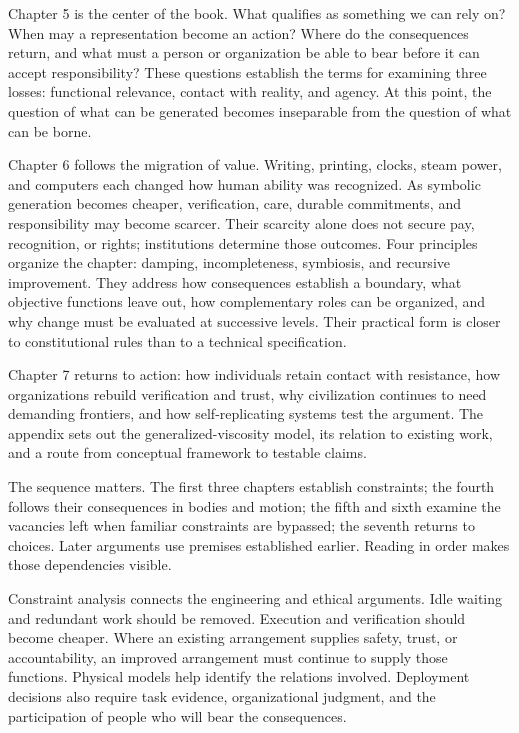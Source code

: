 \documentclass[11pt,openany]{book}
\begin{document}
Chapter 5 is the center of the book. What qualifies as something we can rely on? When may a representation become an action? Where do the consequences return, and what must a person or organization be able to bear before it can accept responsibility? These questions establish the terms for examining three losses: functional relevance, contact with reality, and agency. At this point, the question of what can be generated becomes inseparable from the question of what can be borne.

Chapter 6 follows the migration of value. Writing, printing, clocks, steam power, and computers each changed how human ability was recognized. As symbolic generation becomes cheaper, verification, care, durable commitments, and responsibility may become scarcer. Their scarcity alone does not secure pay, recognition, or rights; institutions determine those outcomes. Four principles organize the chapter: damping, incompleteness, symbiosis, and recursive improvement. They address how consequences establish a boundary, what objective functions leave out, how complementary roles can be organized, and why change must be evaluated at successive levels. Their practical form is closer to constitutional rules than to a technical specification.

Chapter 7 returns to action: how individuals retain contact with resistance, how organizations rebuild verification and trust, why civilization continues to need demanding frontiers, and how self-replicating systems test the argument. The appendix sets out the generalized-viscosity model, its relation to existing work, and a route from conceptual framework to testable claims.

The sequence matters. The first three chapters establish constraints; the fourth follows their consequences in bodies and motion; the fifth and sixth examine the vacancies left when familiar constraints are bypassed; the seventh returns to choices. Later arguments use premises established earlier. Reading in order makes those dependencies visible.

Constraint analysis connects the engineering and ethical arguments. Idle waiting and redundant work should be removed. Execution and verification should become cheaper. Where an existing arrangement supplies safety, trust, or accountability, an improved arrangement must continue to supply those functions. Physical models help identify the relations involved. Deployment decisions also require task evidence, organizational judgment, and the participation of people who will bear the consequences.
\end{document}
